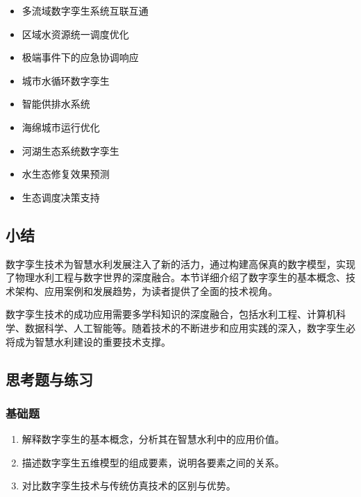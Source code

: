 \begin{itemize}
\tightlist
\item
  多流域数字孪生系统互联互通
\item
  区域水资源统一调度优化
\item
  极端事件下的应急协调响应
\end{itemize}


\begin{itemize}
\tightlist
\item
  城市水循环数字孪生
\item
  智能供排水系统
\item
  海绵城市运行优化
\end{itemize}


\begin{itemize}
\tightlist
\item
  河湖生态系统数字孪生
\item
  水生态修复效果预测
\item
  生态调度决策支持
\end{itemize}

\hypertarget{ux5c0fux7ed3-5}{%
\subsection{小结}\label{ux5c0fux7ed3-5}}

数字孪生技术为智慧水利发展注入了新的活力，通过构建高保真的数字模型，实现了物理水利工程与数字世界的深度融合。本节详细介绍了数字孪生的基本概念、技术架构、应用案例和发展趋势，为读者提供了全面的技术视角。

数字孪生技术的成功应用需要多学科知识的深度融合，包括水利工程、计算机科学、数据科学、人工智能等。随着技术的不断进步和应用实践的深入，数字孪生必将成为智慧水利建设的重要技术支撑。

\hypertarget{ux601dux8003ux9898ux4e0eux7ec3ux4e60-7}{%
\subsection{思考题与练习}\label{ux601dux8003ux9898ux4e0eux7ec3ux4e60-7}}

\hypertarget{ux57faux7840ux9898-7}{%
\subsubsection{基础题}\label{ux57faux7840ux9898-7}}

\begin{enumerate}
\def\labelenumi{\arabic{enumi}.}
\tightlist
\item
  解释数字孪生的基本概念，分析其在智慧水利中的应用价值。
\item
  描述数字孪生五维模型的组成要素，说明各要素之间的关系。
\item
  对比数字孪生技术与传统仿真技术的区别与优势。
\end{enumerate}

